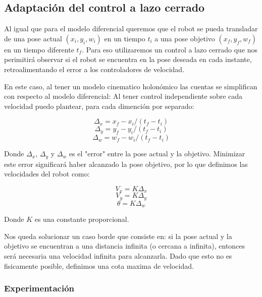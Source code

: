
\subsection{Adaptación del control a lazo cerrado}

Al igual que para el modelo diferencial queremos que el robot se pueda transladar de una pose actual $(x_i,y_i,w_i)$ en un tiempo $t_i$ a una pose objetivo $(x_f,y_f,w_f)$ en un tiempo diferente $t_f$. Para eso utilizaremos un control a lazo cerrado que nos perimitirá observar si el robot se encuentra en la pose deseada en cada instante, retroalimentando el error a los controladores de velocidad.

En este caso, al tener un modelo cinematico holonómico las cuentas se simplifican con respecto al modelo diferencial: Al tener control independiente sobre cada velocidad puedo plantear, para cada dimención por separado:

$$\Delta_x = x_f - x_i / (t_f - t_i)$$
$$\Delta_y = y_f - y_i / (t_f - t_i)$$
$$\Delta_w = w_f - w_i / (t_f - t_i)$$

Donde $\Delta_x$, $\Delta_y$ y $\Delta_w$ es el "error" entre la pose actual y la objetivo. Minimizar este error significará haber alcanzado la pose objetivo, por lo que definimos las velocidades del robot como:

$$V_x = K \Delta_x $$
$$V_y = K \Delta_y $$
$$\theta = K \Delta_w $$

Donde $K$ es una constante proporcional.

Nos queda solucionar un caso borde que consiste en: si la pose actual y la objetivo se encuentran a una distancia infinita (o cercana a infinita), entonces será necesaria una velocidad infinita para alcanzarla. Dado que esto no es fisicamente posible, definimos una cota maxima de velocidad.

\subsubsection{Experimentación}

